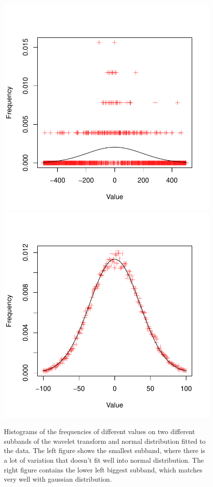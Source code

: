 \documentclass{article}
\begin{document}
\begin{figure}
	\includegraphics[scale=0.5]{histo1}
	\includegraphics[scale=0.5]{histo15}
	\caption{Histograms of the frequencies of different values on two different subbands of the wavelet transform and normal distribution fitted to the data. The left figure shows the smallest subband, where there is a lot of variation that doesn't fit well into normal distribution. The right figure contains the lower left biggest subband, which matches very well with gaussian distribution.}\label{fig:histo}
\end{figure}
\end{document}
